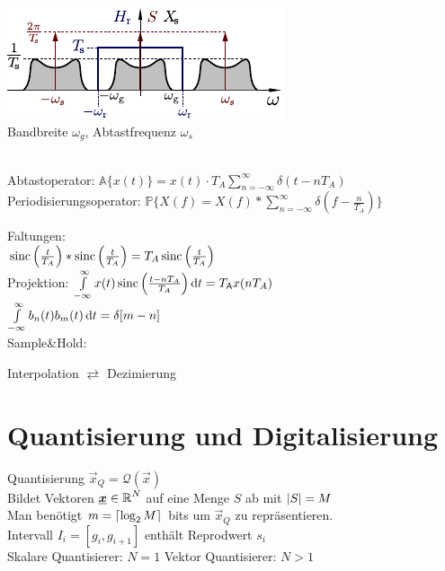 \documentclass[fs, footer]{latex4ei}
\begin{document}
\begin{multicols*}{4}
{\includegraphics[scale = 1.3]{./img/sampletheorem.pdf}\\

Bandbreite $\omega_g$, Abtastfrequenz $\omega_s$\\
\\
 \qquad {}

Abtastoperator: $\mathbb A\{x(t)\} = x(t) \cdot T_A \sum \limits_{n = - \infty}^{\infty} \delta (t - n T_A)$ \\
Periodisierungsoperator: $\mathbb P \{ X(f) = X(f) * \sum \limits_{n = - \infty}^\infty \delta (f - \frac{n}{T_A})\}$
}

Faltungen:\\
	$\operatorname{sinc}\left(\frac{t}{T_A}\right) * \operatorname{sinc}\left(\frac{t}{T_A}\right) = T_A \operatorname{sinc}\left(\frac{t}{T_A}\right)$\\

Projektion: $\int\limits_{-\infty}^{\infty} x(t) \sinc\left( \frac{t- nT_A}{T_A}\right) \diff t = T_{\ir A} x(n T_A)$\\
$\int\limits_{-\infty}^{\infty} b_n(t) b_m(t) \diff t = \delta[m-n]$\\ 


Sample\&Hold: 



Interpolation $\rightleftarrows$ Dezimierung\\



\section{Quantisierung und Digitalisierung}

Quantisierung $\vec x_Q = \mathcal Q(\vec x)$\\
Bildet Vektoren $\underline{\boldsymbol {x}} \in \operatorname{\mathbb R}^N$ auf eine Menge $S$ ab mit $\left\vert S\right\vert = M$\\
Man benötigt $m = \left\lceil {\log_2 M} \right\rceil$ bits um $\vec x_Q$ zu repräsentieren.\\
Intervall $I_i = [g_i, g_{i+1}]$ enthält Reprodwert $s_i$\\
Skalare Quantisierer: $N=1$ \qquad Vektor Quantisierer: $N > 1$\\



\end{multicols*}
\end{document}
